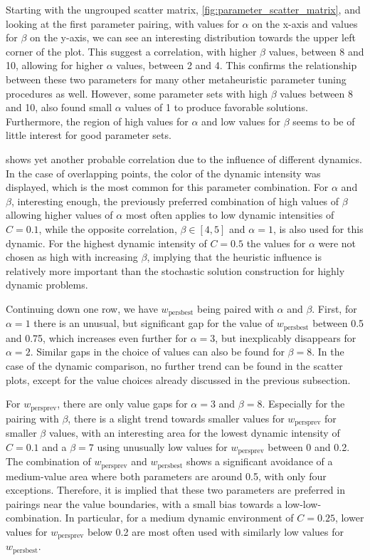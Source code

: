 Starting with the ungrouped scatter matrix, \cref{fig:parameter_scatter_matrix}, and looking at the first parameter pairing, with values for $\alpha$ on the x-axis and values for $\beta$ on the y-axis, we can see an interesting distribution towards the upper left corner of the plot. This suggest a correlation, with higher $\beta$ values, between 8 and 10, allowing for higher $\alpha$ values, between 2 and 4. This confirms the relationship between these two parameters for many other metaheuristic parameter tuning procedures as well. However, some parameter sets with high $\beta$ values between 8 and 10, also found small $\alpha$ values of 1 to produce favorable solutions. Furthermore, the region of high values for $\alpha$ and low values for $\beta$ seems to be of little interest for good parameter sets. 

 shows yet another probable correlation due to the influence of different dynamics. In the case of overlapping points, the color of the dynamic intensity was displayed, which is the most common for this parameter combination.
For $\alpha$ and $\beta$, interesting enough, the previously preferred combination of high values of $\beta$ allowing higher values of $\alpha$ most often applies to low dynamic intensities of $C=0.1$, while the opposite correlation, $\beta \in [4,5]$ and $\alpha = 1$, is also used for this dynamic. For the highest dynamic intensity of $C=0.5$ the values for $\alpha$ were not chosen as high with increasing $\beta$, implying that the heuristic influence is relatively more important than the stochastic solution construction for highly dynamic problems.

Continuing down one row, we have $w_{\text{persbest}}$ being paired with $\alpha$ and $\beta$. First, for $\alpha=1$ there is an unusual, but significant gap for the value of $w_{\text{persbest}}$ between 0.5 and 0.75, which increases even further for $\alpha=3$, but inexplicably disappears for $\alpha=2$. Similar gaps in the choice of values can also be found for $\beta = 8$. In the case of the dynamic comparison, no further trend can be found in the scatter plots, except for the value choices already discussed in the previous subsection.

For $w_{\text{persprev}}$, there are only value gaps for $\alpha = 3$ and $\beta = 8$. Especially for the pairing with $\beta$, there is a slight trend towards smaller values for $w_{\text{persprev}}$ for smaller $\beta$ values, with an interesting area for the lowest dynamic intensity of $C=0.1$ and a $\beta = 7$ using unusually low values for $w_{\text{persprev}}$ between 0 and 0.2. The combination of $w_{\text{persprev}}$ and $w_{\text{persbest}}$ shows a significant avoidance of a medium-value area where both parameters are around 0.5, with only four exceptions. Therefore, it is implied that these two parameters are preferred in pairings near the value boundaries, with a small bias towards a low-low-combination. In particular, for a medium dynamic environment of $C=0.25$, lower values for $w_{\text{persprev}}$ below 0.2 are most often used with similarly low values for $w_{\text{persbest}}$.


